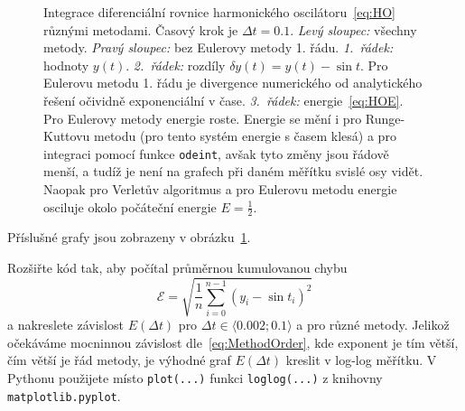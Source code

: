 \documentclass[a4paper,11pt,twoside]{article}
\def\code#1{\textnormal{\texttt{#1}}}
\begin{document}
\begin{solution}
        \begin{figure}[!htbp]
            \begin{subfigure}{0.49\linewidth}
                \centering{}
            \end{subfigure}
            \hfill
            \begin{subfigure}{0.49\linewidth}
                \centering{}
            \end{subfigure}
            \begin{subfigure}{0.49\linewidth}
                \centering{}
            \end{subfigure}
            \hfill
            \begin{subfigure}{0.49\linewidth}
                \centering{}
            \end{subfigure}
			\caption{
                \protect\small
                Integrace diferenciální rovnice harmonického oscilátoru~\eqref{eq:HO} různými metodami.
                Časový krok je $\Delta t=0.1$.
                \emph{Levý sloupec:} všechny metody.
                \emph{Pravý sloupec:} bez Eulerovy metody 1. řádu.
                \emph{1.~řádek:} hodnoty $y(t)$.
                \emph{2.~řádek:} rozdíly $\delta y(t)=y(t)-\sin{t}$.
                Pro Eulerovu metodu 1. řádu je divergence numerického od analytického řešení očividně exponenciální v čase.
                \emph{3.~řádek:} energie~\eqref{eq:HOE}. 
                Pro Eulerovy metody energie roste.
                Energie se mění i pro Runge-Kuttovu metodu (pro tento systém energie s časem klesá) a pro integraci pomocí funkce \code{odeint}, avšak tyto změny jsou řádově menší, a tudíž je není na grafech při daném měřítku svislé osy vidět.
                Naopak pro Verletův algoritmus a pro  Eulerovu metodu energie osciluje okolo počáteční energie $E=\frac{1}{2}$.
            }	
            \label{fig:HO}
		\end{figure}

        Příslušné grafy jsou zobrazeny v obrázku~\ref{fig:HO}.
    \end{solution}

    \begin{task}
        Rozšiřte kód tak, aby počítal průměrnou kumulovanou chybu
        \begin{equation}\label{eq:HOError}
            \mathcal{E}=\sqrt{\frac{1}{n}\sum_{i=0}^{n-1}\left(y_{i}-\sin t_{i}\right)^{2}}
        \end{equation}
        a nakreslete závislost $E(\Delta t)$ pro $\Delta t\in\langle0.002;0.1\rangle$ a pro různé metody.
        Jelikož očekáváme mocninnou závislost dle~\eqref{eq:MethodOrder}, kde exponent je tím větší, čím větší je řád metody, je výhodné graf $E(\Delta t)$ kreslit v log-log měřítku.
        V Pythonu použijete místo \textnormal{\texttt{plot(...)}} funkci \textnormal{\texttt{loglog(...)}} z knihovny \textnormal{\texttt{matplotlib.pyplot}}.
    \end{task}
\end{document}

